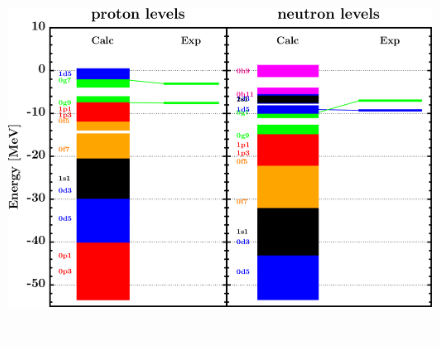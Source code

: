 \documentclass[twocolumn,secnumarabic,amssymb, nobibnotes, aps, prl,
superscriptaddress, nobalancelastpage, draft]{revtex4}
\begin{document}
\begin{figure}[!htb]
\begin{minipage}{0.4\linewidth}
        \label{DOM_sn112_chargeDensity}
    \end{minipage}
    \begin{minipage}{0.35\linewidth}
        \centering
        \includegraphics[width=\linewidth]{figures/sn112_SPLevels.png}
        \label{DOM_sn112_SPLevels}
    \end{minipage}
    \begin{minipage}{0.4\linewidth}
        \centering
        \includegraphics[width=\linewidth]{figures/sn112_RMSRadius.png}

\end{minipage}
\end{figure}
\end{document}
